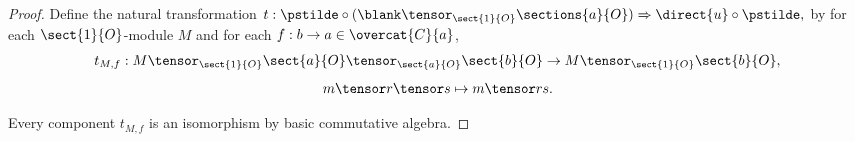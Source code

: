 
\begin{proof}
Define the natural transformation
$t: \pstilde \circ (\blank \tensor_{\sect{1}{O}} \sections{a}{O}) \Rightarrow \direct{u} \circ \pstilde,$
by 
for each $\sect{1}{O}$-module $M$
and for each $f:b\rightarrow a\in \overcat{C}{a}$,
\[t_{M,f}: M \tensor_{\sect{1}{O}} \sect{a}{O} \tensor_{\sect{a}{O}} \sect{b}{O}  
	\rightarrow  M \tensor_{\sect{1}{O}} \sect{b}{O},\]
\[m\tensor r \tensor s \mapsto m \tensor rs.\]

Every component $t_{M,f}$ is an isomorphism by basic commutative algebra.
\end{proof}

